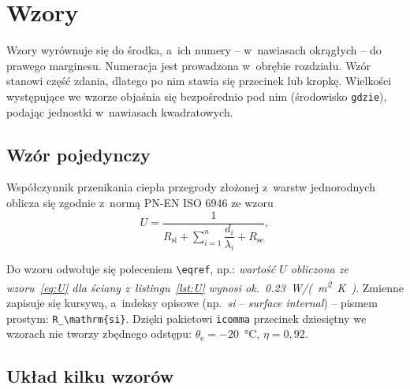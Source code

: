 \section{Wzory}
\label{sec:wzory}

Wzory wyrównuje się do środka, a~ich numery -- w~nawiasach okrągłych -- do
prawego marginesu. Numeracja jest prowadzona w~obrębie rozdziału. Wzór
stanowi część zdania, dlatego po nim stawia się przecinek lub kropkę.
Wielkości występujące we wzorze objaśnia się bezpośrednio pod nim
(środowisko \texttt{gdzie}), podając jednostki w~nawiasach kwadratowych.

\subsection{Wzór pojedynczy}

Współczynnik przenikania ciepła przegrody złożonej z~warstw jednorodnych
oblicza się zgodnie z~normą PN-EN ISO 6946 \cite{pn6946} ze wzoru
\begin{equation}
  U = \frac{1}{R_\mathrm{si} + \sum\limits_{i=1}^{n}\dfrac{d_i}{\lambda_i}
      + R_\mathrm{se}},
  \label{eq:U}
\end{equation}
\begin{gdzie}
\end{gdzie}

Do wzoru odwołuje się poleceniem \verb|\eqref|, np.: \emph{wartość $U$
obliczona ze wzoru~\eqref{eq:U} dla ściany z~listingu~\ref{lst:U} wynosi
ok.\ \qty{0.23}{W/(m^2.K)}}. Zmienne zapisuje się kursywą, a~indeksy
opisowe (np.\ \emph{si} -- \emph{surface internal}) -- pismem prostym:
\verb|R_\mathrm{si}|. Dzięki pakietowi \texttt{icomma} przecinek
dziesiętny we wzorach nie tworzy zbędnego odstępu: $\theta_\mathrm{e} =
-20$~°C, $\eta = 0,92$.

\subsection{Układ kilku wzorów}

